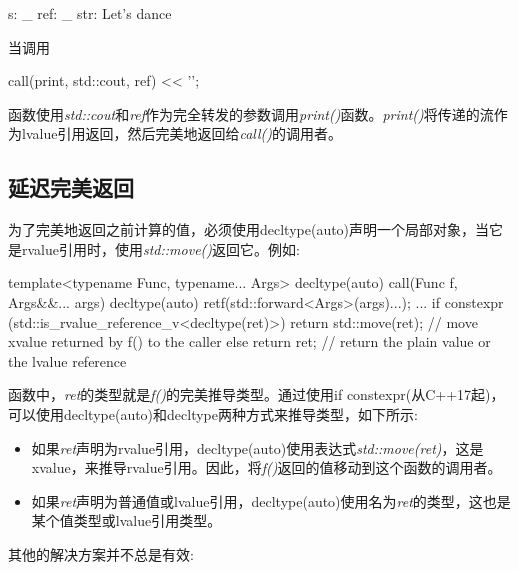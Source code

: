 \begin{shell}
s: _
ref: _
str: Let's dance
\end{shell}

当调用

\begin{cppcode}
call(print, std::cout, ref) << '\n';
\end{cppcode}

函数使用\textit{std::cout}和\textit{ref}作为完全转发的参数调用\textit{print()}函数。\textit{print()}将传递的流作为lvalue引用返回，然后完美地返回给\textit{call()}的调用者。

\subsection{延迟完美返回}

为了完美地返回之前计算的值，必须使用decltype(auto)声明一个局部对象，当它是rvalue引用时，使用\textit{std::move()}返回它。例如:

\begin{cppcode}
template<typename Func, typename... Args>
decltype(auto) call(Func f, Args&&... args)
{
	decltype(auto) ret{f(std::forward<Args>(args)...)};
	...
	if constexpr (std::is_rvalue_reference_v<decltype(ret)>) {
		return std::move(ret); // move xvalue returned by f() to the caller
	}
	else {
		return ret; // return the plain value or the lvalue reference
	}
}
\end{cppcode}

函数中，\textit{ret}的类型就是\textit{f()}的完美推导类型。通过使用if constexpr(从C++17起)，可以使用decltype(auto)和decltype两种方式来推导类型，如下所示:

\begin{itemize}
	\item 如果\textit{ret}声明为rvalue引用，decltype(auto)使用表达式\textit{std::move(ret)}，这是xvalue，来推导rvalue引用。因此，将\textit{f()}返回的值移动到这个函数的调用者。
	\item 如果\textit{ret}声明为普通值或lvalue引用，decltype(auto)使用名为\textit{ret}的类型，这也是某个值类型或lvalue引用类型。
\end{itemize}

其他的解决方案并不总是有效:

